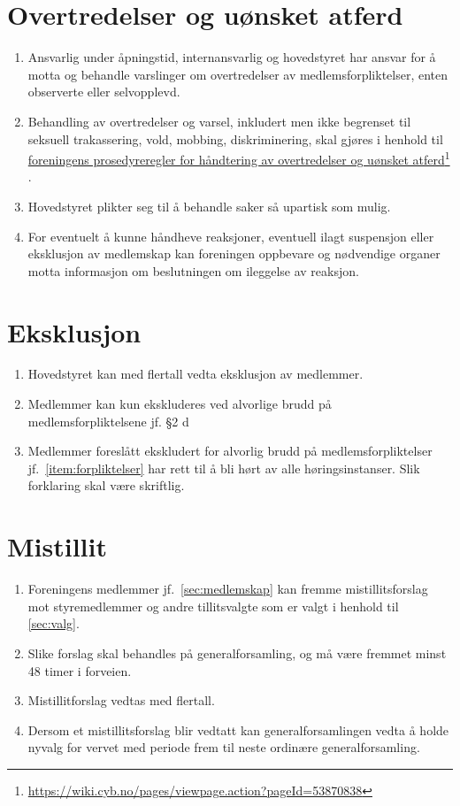 \documentclass[8pt,norsk,a4paper]{article}
\newcommand\fhref[2]{%
	\href{#1}{#2}\footnote{\url{#1}}%
}
\begin{document}
\section{Overtredelser og uønsket atferd}
\begin{enumerate}
	\item Ansvarlig under åpningstid, internansvarlig og hovedstyret har ansvar for å motta og behandle varslinger om overtredelser av medlemsforpliktelser, enten observerte eller selvopplevd.
	\item Behandling av overtredelser og varsel, inkludert men ikke begrenset til seksuell trakassering, vold, mobbing, diskriminering, skal gjøres i henhold til \fhref{https://wiki.cyb.no/pages/viewpage.action?pageId=53870838}{foreningens prosedyreregler for håndtering av overtredelser og uønsket atferd}.
	\item Hovedstyret plikter seg til å behandle saker så upartisk som mulig.
	\item For eventuelt å kunne håndheve reaksjoner, eventuell ilagt suspensjon eller eksklusjon av medlemskap kan foreningen oppbevare og nødvendige organer motta informasjon om beslutningen om ileggelse av reaksjon.
\end{enumerate}

\section{Eksklusjon}
\begin{enumerate}
	\item Hovedstyret kan med  flertall vedta eksklusjon av medlemmer.
	\item Medlemmer kan kun ekskluderes ved alvorlige brudd på medlemsforpliktelsene jf. §2 d
	\item Medlemmer foreslått ekskludert for alvorlig brudd på medlemsforpliktelser jf.~\ref{item:forpliktelser} har rett til å bli hørt av alle høringsinstanser. Slik forklaring skal være skriftlig.
\end{enumerate}

\section{Mistillit}\label{sec:mistillit}
\begin{enumerate}
	\item{Foreningens medlemmer jf.~\ref{sec:medlemskap} kan fremme mistillitsforslag mot styremedlemmer og andre tillitsvalgte som er valgt i henhold til \ref{sec:valg}.}
	\item{Slike forslag skal behandles på generalforsamling, og må være fremmet minst 48 timer i forveien.}
	\item{Mistillitforslag vedtas med  flertall.}
	\item{Dersom et mistillitsforslag blir vedtatt kan generalforsamlingen vedta å holde nyvalg for vervet med periode frem til neste ordinære generalforsamling.}
\end{enumerate}
\end{document}
